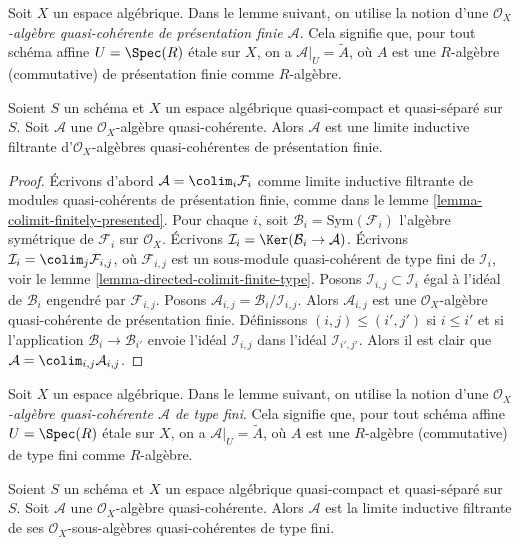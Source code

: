 \noindent
Soit $X$ un espace algébrique. Dans le lemme suivant, on utilise la notion
d'une {\it $\mathcal{O}_X$-algèbre quasi-cohérente de présentation finie
$\mathcal{A}$}. Cela signifie que, pour tout schéma affine
$U = \Spec(R)$ étale sur $X$, on a $\mathcal{A}|_U = \widetilde{A}$,
où $A$ est une $R$-algèbre (commutative) de présentation finie
comme $R$-algèbre.

\begin{lemma}
\label{lemma-algebra-directed-colimit-finite-presentation}
Soient $S$ un schéma et $X$ un espace algébrique quasi-compact et quasi-séparé
sur $S$.
Soit $\mathcal{A}$ une $\mathcal{O}_X$-algèbre quasi-cohérente.
Alors $\mathcal{A}$ est une limite inductive filtrante d'$\mathcal{O}_X$-algèbres
quasi-cohérentes de présentation finie.
\end{lemma}

\begin{proof}
Écrivons d'abord $\mathcal{A} = \colim_i \mathcal{F}_i$ comme limite inductive filtrante
de modules quasi-cohérents de présentation finie, comme dans le
lemme \ref{lemma-colimit-finitely-presented}.
Pour chaque $i$, soit $\mathcal{B}_i = \text{Sym}(\mathcal{F}_i)$ l'algèbre
symétrique de $\mathcal{F}_i$ sur $\mathcal{O}_X$. Écrivons
$\mathcal{I}_i = \Ker(\mathcal{B}_i \to \mathcal{A})$. Écrivons
$\mathcal{I}_i = \colim_j \mathcal{F}_{i, j}$, où
$\mathcal{F}_{i, j}$ est un sous-module quasi-cohérent de type fini de
$\mathcal{I}_i$, voir le
lemme \ref{lemma-directed-colimit-finite-type}.
Posons $\mathcal{I}_{i, j} \subset \mathcal{I}_i$
égal à l'idéal de $\mathcal{B}_i$ engendré par $\mathcal{F}_{i, j}$.
Posons $\mathcal{A}_{i, j} = \mathcal{B}_i/\mathcal{I}_{i, j}$.
Alors $\mathcal{A}_{i, j}$ est une $\mathcal{O}_X$-algèbre quasi-cohérente
de présentation finie. Définissons $(i, j) \leq (i', j')$ si
$i \leq i'$ et si l'application $\mathcal{B}_i \to \mathcal{B}_{i'}$
envoie l'idéal $\mathcal{I}_{i, j}$ dans l'idéal $\mathcal{I}_{i', j'}$.
Alors il est clair que $\mathcal{A} = \colim_{i, j} \mathcal{A}_{i, j}$.
\end{proof}

\noindent
Soit $X$ un espace algébrique. Dans le lemme suivant, on utilise la notion
d'une {\it $\mathcal{O}_X$-algèbre quasi-cohérente $\mathcal{A}$
de type fini}. Cela signifie que, pour tout schéma affine
$U = \Spec(R)$ étale sur $X$, on a $\mathcal{A}|_U = \widetilde{A}$,
où $A$ est une $R$-algèbre (commutative) de type fini
comme $R$-algèbre.

\begin{lemma}
\label{lemma-algebra-directed-colimit-finite-type}
Soient $S$ un schéma et $X$ un espace algébrique quasi-compact et quasi-séparé
sur $S$. Soit $\mathcal{A}$ une $\mathcal{O}_X$-algèbre quasi-cohérente.
Alors $\mathcal{A}$ est la limite inductive filtrante de ses
$\mathcal{O}_X$-sous-algèbres quasi-cohérentes de type fini.
\end{lemma}

